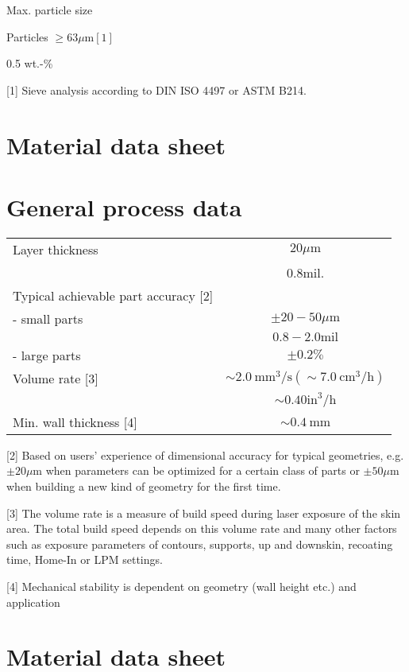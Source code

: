 \documentclass[10pt]{article}
\begin{document}
Max. particle size

Particles $\geq 63 \mu \mathrm{m}[1]$

0.5 wt.-\%

[1] Sieve analysis according to DIN ISO 4497 or ASTM B214.

\section*{Material data sheet}
\section*{General process data}
\begin{center}
\begin{tabular}{lc}
\hline
Layer thickness & $20 \mu \mathrm{m}$ \\
 & $0.8 \mathrm{mil}$. \\
\hline
Typical achievable part accuracy [2] &  \\
- small parts & $\pm 20-50 \mu \mathrm{m}$ \\
 & $0.8-2.0 \mathrm{mil}$ \\
- large parts & $\pm 0.2 \%$ \\
\hline
Volume rate [3] & $\sim 2.0 \mathrm{~mm}^{3} / \mathrm{s}\left(\sim 7.0 \mathrm{~cm}^{3} / \mathrm{h}\right)$ \\
 & $\sim 0.40 \mathrm{in}^{3} / \mathrm{h}$ \\
\hline
Min. wall thickness [4] & $\sim 0.4 \mathrm{~mm}$ \\
\hline
\end{tabular}
\end{center}

[2] Based on users' experience of dimensional accuracy for typical geometries, e.g. $\pm 20 \mu \mathrm{m}$ when parameters can be optimized for a certain class of parts or $\pm 50 \mu \mathrm{m}$ when building a new kind of geometry for the first time.

[3] The volume rate is a measure of build speed during laser exposure of the skin area. The total build speed depends on this volume rate and many other factors such as exposure parameters of contours, supports, up and downskin, recoating time, Home-In or LPM settings.

[4] Mechanical stability is dependent on geometry (wall height etc.) and application

\section*{Material data sheet}
\end{document}
